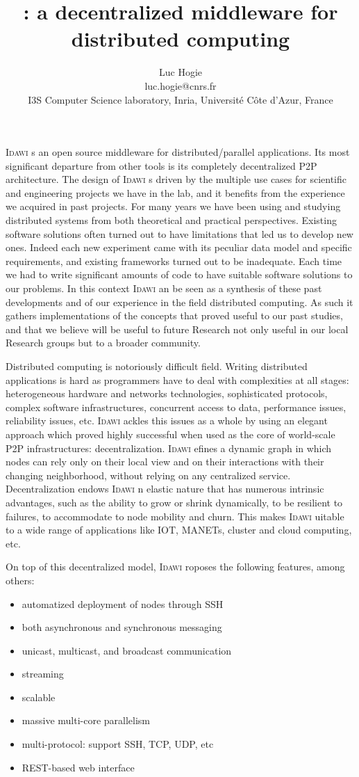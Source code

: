 \documentclass{article}
\title{\idawi: a decentralized middleware for distributed computing}
\author{Luc Hogie \\ luc.hogie@cnrs.fr \\
I3S Computer Science laboratory, Inria, Universit\'e C\^ote d'Azur, France}
\newcommand{\idawi}[1]{\textsc{Idawi}\xspace}
\begin{document}
\maketitle

\idawi is an open source middleware for distributed/parallel applications. Its most significant departure from other tools is its completely decentralized P2P architecture.
The design of \idawi is driven by the multiple use cases for scientific and engineering projects we have in the lab, and it benefits from the experience we acquired in past projects. For many years we have been using and studying distributed systems from both theoretical and practical perspectives. 
Existing software solutions often turned out to have limitations that led us to develop new ones. Indeed each new experiment came with its peculiar data model and specific requirements, and existing frameworks turned out to be inadequate. Each time we had to write significant amounts of code to have suitable software solutions to our problems.
In this context \idawi can be seen as a synthesis of these past developments and of our experience in the field distributed computing. As such it gathers implementations of the concepts that proved useful to our past studies, and that we believe will be useful to future Research not only useful in our local Research groups but to a broader community.

Distributed computing is notoriously difficult field. Writing distributed applications is hard as programmers have to deal with complexities at all stages: heterogeneous hardware and networks technologies, sophisticated protocols, complex software infrastructures, concurrent access to data, performance issues, reliability issues, etc.
\idawi tackles this issues as a whole by using an elegant approach which proved highly successful when used as the core of world-scale P2P infrastructures: decentralization. \idawi defines a dynamic graph  in which nodes can rely only on their local view and on their interactions with their changing neighborhood, without relying on any centralized service. Decentralization endows \idawi an elastic nature that has numerous intrinsic advantages, such as the ability to grow or shrink dynamically, to be resilient to failures, to accommodate to node mobility and churn.
This  makes \idawi suitable to a wide range of applications like IOT, MANETs, cluster and cloud computing, etc.


On top of this decentralized model, \idawi proposes the following features, among others: 
\begin{itemize}
    \item automatized deployment of nodes through SSH
    \item both asynchronous and synchronous messaging
    \item unicast, multicast, and broadcast communication
    \item streaming
    \item scalable
    \item massive multi-core parallelism
    \item multi-protocol: support SSH, TCP, UDP, etc
    \item REST-based web interface
\end{itemize}
\end{document}
